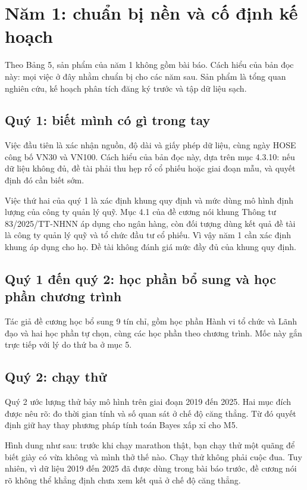 \section{Năm 1: chuẩn bị nền và cố định kế hoạch}

Theo Bảng 5, sản phẩm của năm 1 không gồm bài báo. Cách hiểu của bản đọc này: mọi việc ở đây nhằm chuẩn bị cho các năm sau. Sản phẩm là tổng quan nghiên cứu, kế hoạch phân tích đăng ký trước và tập dữ liệu sạch.

\subsection{Quý 1: biết mình có gì trong tay}

Việc đầu tiên là xác nhận nguồn, độ dài và giấy phép dữ liệu, cùng ngày HOSE công bố VN30 và VN100. Cách hiểu của bản đọc này, dựa trên mục 4.3.10: nếu dữ liệu không đủ, đề tài phải thu hẹp rổ cổ phiếu hoặc giai đoạn mẫu, và quyết định đó cần biết sớm.

Việc thứ hai của quý 1 là xác định khung quy định và mức dùng mô hình định lượng của công ty quản lý quỹ. Mục 4.1 của đề cương nói khung Thông tư 83/2025/TT-NHNN áp dụng cho ngân hàng, còn đối tượng dùng kết quả đề tài là công ty quản lý quỹ và tổ chức đầu tư cổ phiếu. Vì vậy năm 1 cần xác định khung áp dụng cho họ. Đề tài không đánh giá mức đầy đủ của khung quy định.

\subsection{Quý 1 đến quý 2: học phần bổ sung và học phần chương trình}

Tác giả đề cương học bổ sung 9 tín chỉ, gồm học phần Hành vi tổ chức và Lãnh đạo và hai học phần tự chọn, cùng các học phần theo chương trình. Mốc này gắn trực tiếp với lý do thứ ba ở mục 5.

\subsection{Quý 2: chạy thử}

Quý 2 ước lượng thử bảy mô hình trên giai đoạn 2019 đến 2025. Hai mục đích được nêu rõ: đo thời gian tính và số quan sát ở chế độ căng thẳng. Từ đó quyết định giữ hay thay phương pháp tính toán Bayes xấp xỉ cho M5.

Hình dung như sau: trước khi chạy marathon thật, bạn chạy thử một quãng để biết giày có vừa không và mình thở thế nào. Chạy thử không phải cuộc đua. Tuy nhiên, vì dữ liệu 2019 đến 2025 đã được dùng trong bài báo trước, đề cương nói rõ không thể khẳng định chưa xem kết quả ở chế độ căng thẳng.

